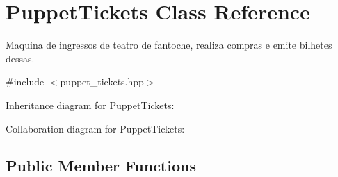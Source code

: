 \hypertarget{class_puppet_tickets}{}\section{Puppet\+Tickets Class Reference}
\label{class_puppet_tickets}


Maquina de ingressos de teatro de fantoche, realiza compras e emite bilhetes dessas.  




{\ttfamily \#include $<$puppet\+\_\+tickets.\+hpp$>$}



Inheritance diagram for Puppet\+Tickets\+:


Collaboration diagram for Puppet\+Tickets\+:
\subsection*{Public Member Functions}
